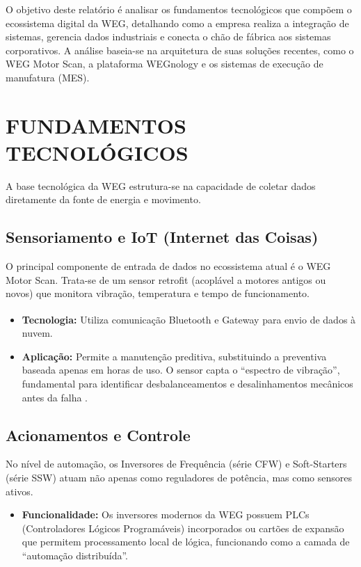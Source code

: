 \documentclass[12pt,a4paper,oneside]{abntex2}
\begin{document}
O objetivo deste relatório é analisar os fundamentos tecnológicos que compõem o ecossistema digital da WEG, detalhando como a empresa realiza a integração de sistemas, gerencia dados industriais e conecta o chão de fábrica aos sistemas corporativos. A análise baseia-se na arquitetura de suas soluções recentes, como o WEG Motor Scan, a plataforma WEGnology e os sistemas de execução de manufatura (MES).

\chapter{FUNDAMENTOS TECNOLÓGICOS}

A base tecnológica da WEG estrutura-se na capacidade de coletar dados diretamente da fonte de energia e movimento.

\section{Sensoriamento e IoT (Internet das Coisas)}

O principal componente de entrada de dados no ecossistema atual é o WEG Motor Scan. Trata-se de um sensor retrofit (acoplável a motores antigos ou novos) que monitora vibração, temperatura e tempo de funcionamento.

\begin{itemize}
  \item \textbf{Tecnologia:} Utiliza comunicação Bluetooth\textsuperscript{\textregistered} e Gateway para envio de dados à nuvem.
  \item \textbf{Aplicação:} Permite a manutenção preditiva, substituindo a preventiva baseada apenas em horas de uso. O sensor capta o ``espectro de vibração'', fundamental para identificar desbalanceamentos e desalinhamentos mecânicos antes da falha \cite{weg2024}.
\end{itemize}

\section{Acionamentos e Controle}

No nível de automação, os Inversores de Frequência (série CFW) e Soft-Starters (série SSW) atuam não apenas como reguladores de potência, mas como sensores ativos.

\begin{itemize}
  \item \textbf{Funcionalidade:} Os inversores modernos da WEG possuem PLCs (Controladores Lógicos Programáveis) incorporados ou cartões de expansão que permitem processamento local de lógica, funcionando como a camada de ``automação distribuída''.
\end{itemize}
\end{document}
